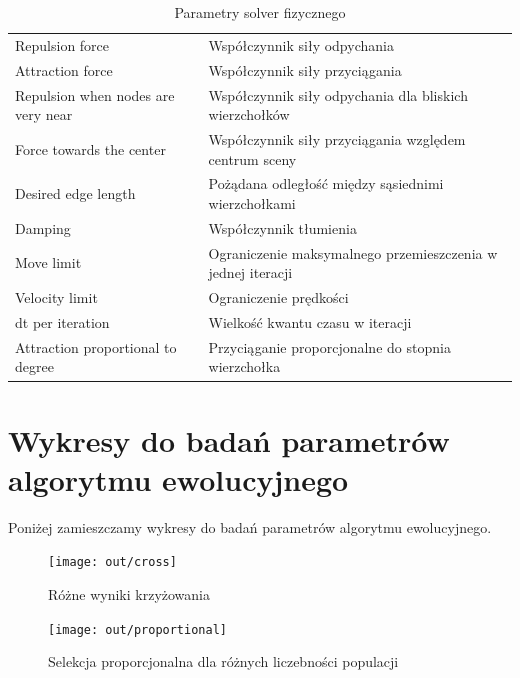 \documentclass[a4paper,onecolumn,oneside,12pt]{mwart}
\begin{document}
\begin{table}[h!]
	\centering
	\begin{tabular}{p{}p{}}
		\hline
Repulsion force & Współczynnik siły odpychania \\
Attraction force & Współczynnik siły przyciągania \\
Repulsion when nodes are very near & Współczynnik siły odpychania dla bliskich wierzchołków \\
Force towards the center & Współczynnik siły przyciągania względem centrum sceny \\
Desired edge length & Pożądana odległość między sąsiednimi wierzchołkami \\
Damping & Współczynnik tłumienia \\
Move limit & Ograniczenie maksymalnego przemieszczenia w jednej iteracji \\
Velocity limit & Ograniczenie prędkości \\
dt per iteration & Wielkość kwantu czasu w iteracji \\
Attraction proportional to degree & Przyciąganie proporcjonalne do stopnia wierzchołka \\
		\hline
	\end{tabular}
	\caption{Parametry solver fizycznego}
	\label{tab:params-solver-force}
\end{table}

\clearpage


\section*{Wykresy do badań parametrów algorytmu ewolucyjnego}

Poniżej zamieszczamy wykresy do badań parametrów algorytmu ewolucyjnego.

\begin{figure}[hp]
	\begin{center}
		\texttt{[image: out/cross]}
	\end{center}
	\caption{Różne wyniki krzyżowania}
	\label{fig:plot:cross}
\end{figure}

\begin{figure}[hp]
	\begin{center}
		\texttt{[image: out/proportional]}
	\end{center}
	\caption{Selekcja proporcjonalna dla różnych liczebności populacji}
	\label{fig:plot:proportional}
\end{figure}
\end{document}
